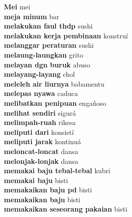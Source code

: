 \textbf{ Mei  } mei \\
\textbf{ meja minum  } bar \\
\textbf{ melakukan faul thdp  } sushi \\
\textbf{ melakukan kerja pembinaan  } konstruí \\
\textbf{ melanggar peraturan  } sushi \\
\textbf{ melaung-laungkan  } grito \\
\textbf{ melayan dgn buruk  } abuso \\
\textbf{ melayang-layang  } chol \\
\textbf{ meleleh air liurnya  } babamentu \\
\textbf{ melepas nyawa  } caduca \\
\textbf{ melibatkan penipuan  } engañoso \\
\textbf{ melihat sendiri  } sigurá \\
\textbf{ melimpah-ruah  } rikesa \\
\textbf{ meliputi dari  } konsistí \\
\textbf{ meliputi jarak  } kontinuá \\
\textbf{ meloncat-loncat  } dansa \\
\textbf{ melonjak-lonjak  } dansa \\
\textbf{ memakai baju tebal-tebal  } kubri \\
\textbf{ memakai baju  } bisti \\
\textbf{ memakaikan baju pd  } bisti \\
\textbf{ memakaikan baju  } bisti \\
\textbf{ memakaikan seseorang pakaian  } bisti \\
